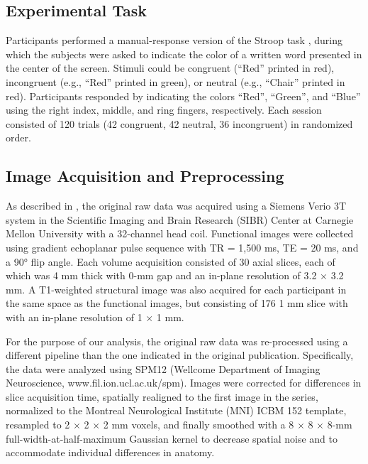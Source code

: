 \documentclass[10pt,letterpaper]{article}
\begin{document}
\subsection{Experimental Task}

Participants performed a manual-response version of the Stroop task \cite{Stroop1935}, during which the subjects were asked to indicate the color of a written word presented in the center of the screen. Stimuli could be congruent (``Red'' printed in red), incongruent (e.g., ``Red'' printed in green), or neutral (e.g., ``Chair'' printed in red). Participants responded by indicating the colors ``Red'', ``Green'', and ``Blue'' using the right index, middle, and ring fingers, respectively. Each session consisted of 120 trials (42 congruent, 42 neutral, 36 incongruent) in randomized order.

\subsection{Image Acquisition and Preprocessing}

As described in , the original raw data was acquired using a Siemens Verio 3T system in the Scientific Imaging and Brain Research (SIBR) Center at Carnegie Mellon University with a 32-channel head coil. Functional images were collected using gradient echoplanar pulse sequence with TR = 1,500 ms, TE = 20 ms, and a 90° flip angle. Each volume acquisition consisted of 30 axial slices, each of which was 4 mm thick with 0-mm gap and an in-plane resolution of 3.2 × 3.2 mm. A T1-weighted structural image was also acquired for each participant in the same space as the functional images, but consisting of 176 1 mm slice with with an in-plane resolution of 1 × 1 mm.

For the purpose of our analysis, the original raw data was re-processed using a different pipeline than the one indicated in the original publication. Specifically, the data were analyzed using SPM12 (Wellcome Department of Imaging Neuroscience, www.fil.ion.ucl.ac.uk/spm). Images were corrected for differences in slice acquisition time, spatially realigned to the first image in the series, normalized to the Montreal Neurological Institute (MNI) ICBM 152 template, resampled to 2 × 2 × 2 mm voxels, and finally smoothed with a 8 × 8 × 8-mm full-width-at-half-maximum Gaussian kernel to decrease spatial noise and to accommodate individual differences in anatomy. %
\end{document}
